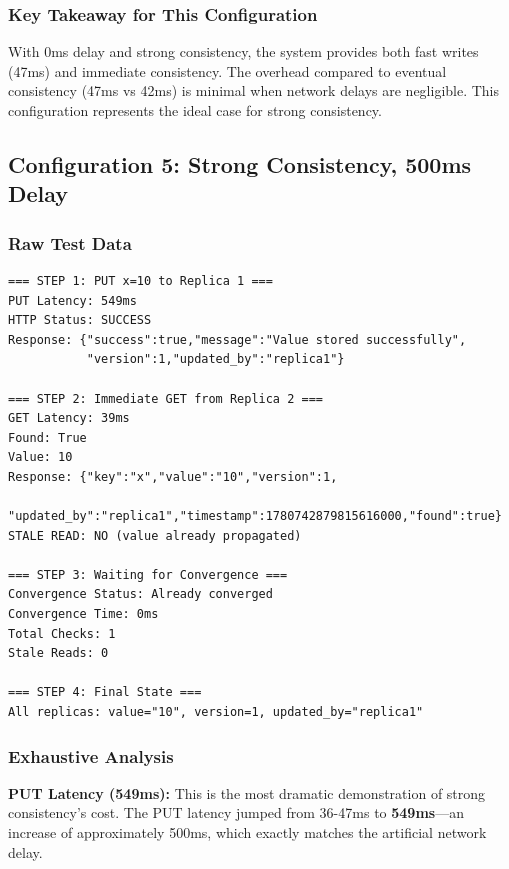 \documentclass[10pt,a4paper]{article}
\begin{document}
\subsubsection{Key Takeaway for This Configuration}

With 0ms delay and strong consistency, the system provides both fast writes (47ms) and immediate consistency. The overhead compared to eventual consistency (47ms vs 42ms) is minimal when network delays are negligible. This configuration represents the ideal case for strong consistency.

\subsection{Configuration 5: Strong Consistency, 500ms Delay}

\subsubsection{Raw Test Data}

\begin{verbatim}
=== STEP 1: PUT x=10 to Replica 1 ===
PUT Latency: 549ms
HTTP Status: SUCCESS
Response: {"success":true,"message":"Value stored successfully",
           "version":1,"updated_by":"replica1"}

=== STEP 2: Immediate GET from Replica 2 ===
GET Latency: 39ms
Found: True
Value: 10
Response: {"key":"x","value":"10","version":1,
           "updated_by":"replica1","timestamp":1780742879815616000,"found":true}
STALE READ: NO (value already propagated)

=== STEP 3: Waiting for Convergence ===
Convergence Status: Already converged
Convergence Time: 0ms
Total Checks: 1
Stale Reads: 0

=== STEP 4: Final State ===
All replicas: value="10", version=1, updated_by="replica1"
\end{verbatim}

\subsubsection{Exhaustive Analysis}

\textbf{PUT Latency (549ms):} This is the most dramatic demonstration of strong consistency's cost. The PUT latency jumped from 36-47ms to \textbf{549ms}---an increase of approximately 500ms, which exactly matches the artificial network delay.
\end{document}
